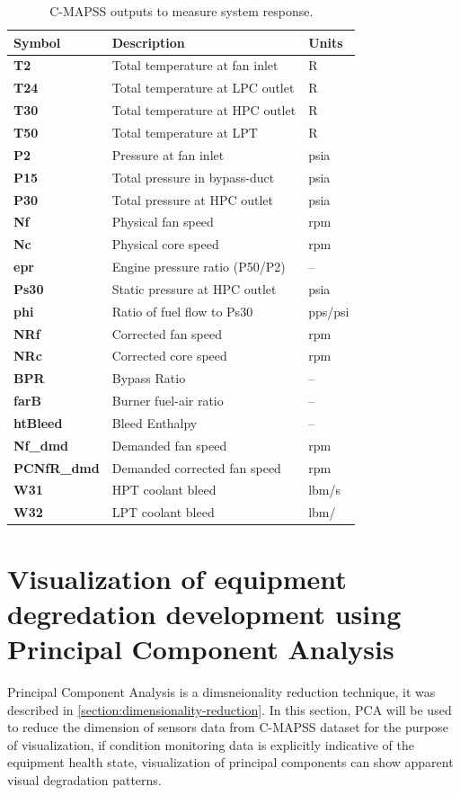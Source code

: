 \begin{table}
    \centering
    \begin{tabular}{l|l|l}
        \hline
        \textbf{Symbol} & \textbf{Description} & \textbf{Units}\\
        \hline
        \textbf{T2} & Total temperature at fan inlet & R \\
        \textbf{T24} & Total temperature at LPC outlet & R \\
        \textbf{T30} & Total temperature at HPC outlet & R  \\
        \textbf{T50} &Total temperature at LPT & R\\
        \textbf{P2} & Pressure at fan inlet& psia\\
        \textbf{P15}& Total pressure in bypass-duct& psia\\
        \textbf{P30}& Total pressure at HPC outlet& psia\\
        \textbf{Nf}& Physical fan speed& rpm\\
        \textbf{Nc} & Physical core speed &rpm\\
        \textbf{epr}& Engine pressure ratio (P50/P2)& --\\
        \textbf{Ps30}& Static pressure at HPC outlet& psia\\
        \textbf{phi}& Ratio of fuel flow to Ps30& pps/psi\\
        \textbf{NRf}& Corrected fan speed &rpm\\
        \textbf{NRc}& Corrected core speed& rpm\\
        \textbf{BPR}& Bypass Ratio& --\\
        \textbf{farB}& Burner fuel-air ratio &--\\
        \textbf{htBleed}& Bleed Enthalpy &-- \\
        \textbf{Nf\_dmd} &Demanded fan speed& rpm\\
        \textbf{PCNfR\_dmd}& Demanded corrected fan speed &rpm\\
        \textbf{W31} & HPT coolant bleed & lbm/s \\
        \textbf{W32} & LPT coolant bleed & lbm/ \\
        \hline
    \end{tabular}
    \caption{C-MAPSS outputs to measure system response.}
    \label{table:c-mapss-sensors}
\end{table}


\section{Visualization of equipment degredation development using Principal Component Analysis}
Principal Component Analysis is a dimsneionality reduction technique, it was described in \ref{section:dimensionality-reduction}. In this section, PCA will be used to reduce the dimension of sensors data from C-MAPSS dataset for the purpose of visualization, if condition monitoring data is explicitly indicative of the equipment health state, visualization of principal components can show apparent visual degradation patterns.

